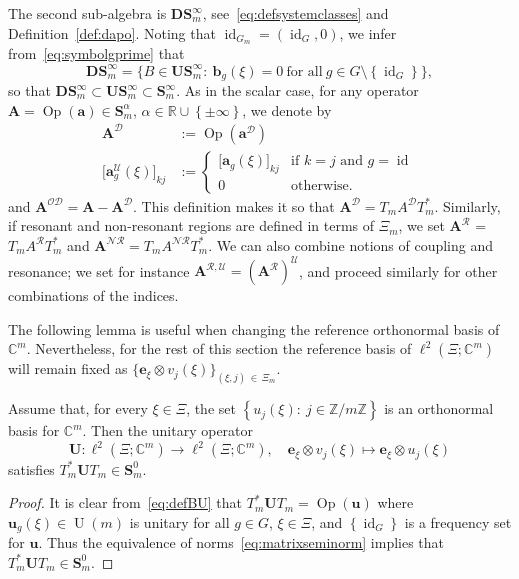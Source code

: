 \documentclass[AHL,Unicode,longabstracts,published]{cedram}
\DeclareMathOperator{\Op}{Op}
\DeclareMathOperator{\id}{id}
\newcommand{\R}{\mathbb R}
\newcommand{\C}{\mathbb C}
\newcommand{\Z}{\mathbb Z}
\newcommand{\CD}{\mathcal{D}}
\newcommand{\CN}{\mathcal{N}}
\newcommand{\CO}{\mathcal{O}}
\newcommand{\CR}{\mathcal{R}}
\newcommand{\CU}{\mathcal{U}}
\newcommand{\CNR}{{\CN\!\CR}}
\newcommand{\ba}{\mathbf a}
\newcommand{\BA}{\mathbf A}
\newcommand{\BD}{\mathbf D}
\newcommand{\BS}{\mathbf S}
\newcommand{\BU}{\mathbf U}
\newcommand{\bbb}{\mathbf b}
\newcommand{\be}{\mathbf e}
\newcommand{\bu}{\mathbf u}
\renewcommand{\subseteq}{\subset}
\newcommand{\set}[1]{\left\{ #1 \right\}}
\begin{document}
The second sub-algebra is $\BD\BS_m^\infty$, see~\eqref{eq:defsystemclasses} and Definition~\ref{def:dapo}. Noting that $\id_{G_m}=(\id_G,0)$, we infer from~\eqref{eq:symbolgprime} that
\begin{equation}
\BD\BS_m^\infty=\big\{B\in\BU\BS_m^\infty:\ \bbb_g(\xi)=0\ \text{for all} \ g\in G\setminus \set{\id_G}\big\},
\end{equation}
so that $\BD\BS_m^\infty \subseteq \BU\BS_m^\infty \subseteq \BS_m^\infty$. As in the scalar case, for any operator $\BA =\Op(\ba)\in \BS_m^\alpha$, $\alpha\in\R\cup\set{\pm\infty}$, we denote by
\begin{equation}\label{eq:diagonalmatrix}
\begin{split}
\BA^\CD &:=\Op(\ba^\CD)\quad\\ \big[\ba_g^\CU(\xi)\big]_{k j}&:=
\begin{cases}
\big[\ba_g(\xi)\big]_{k j} & \text{if }k =j
\text{ and } g = \id\\ 0 &
\text{otherwise}.
\end{cases}
\end{split}
\end{equation}
and $\BA^{\CO\CD} = \BA - \BA^\CD$. This definition makes it so that $\BA^\CD = T_m A^\CD T_m^*$. Similarly, if resonant and non-resonant regions are defined in terms of $\Xi_m$, we set $\BA^\CR$ = $T_mA^\CR T_m^*$ and $\BA^{\CNR} = T_m A^{\CNR} T_m^*$. We can also combine notions of coupling and resonance; we set for instance $\BA^{\CR,\CU} = (\BA^{\CR})^\CU$, and proceed similarly for other combinations of the indices.



The following lemma is useful when changing the reference orthonormal basis of $\C^m$. Nevertheless, for the rest of this section the reference basis of $\ell^2(\Xi;\C^m)$ will remain fixed as $\{\be_\xi\otimes v_j(\xi)\}_{(\xi,j)\,\in\,\Xi_m}$.
\begin{lemm}
Assume that, for every $\xi\in\Xi$, the set $\set{u_j(\xi):\ j\in \Z/m\Z}$ is an orthonormal basis for $\C^m$. Then the unitary operator
\begin{equation}\label{eq:defBU}
\BU:\ell^2\left(\Xi;\C^m\right) \to \ell^2\left(\Xi;\C^m\right), \quad \be_\xi\otimes v_j(\xi)\mapsto \be_\xi\otimes u_j(\xi)
\end{equation}
satisfies $T_m^*\BU T_m\in\BS_m^0$.
\end{lemm}
\begin{proof}
It is clear from~\eqref{eq:defBU} that $T_m^*\BU T_m=\Op(\bu)$ where $\bu_g(\xi)\in \operatorname{U}(m)$ is unitary for all $g\in G$, $\xi\in\Xi$, and $\set{\id_G}$ is a frequency set for $\bu$. Thus the equivalence of norms~\eqref{eq:matrixseminorm} implies that $T_m^*\BU T_m\in\BS_m^0$.
\end{proof}
\end{document}
